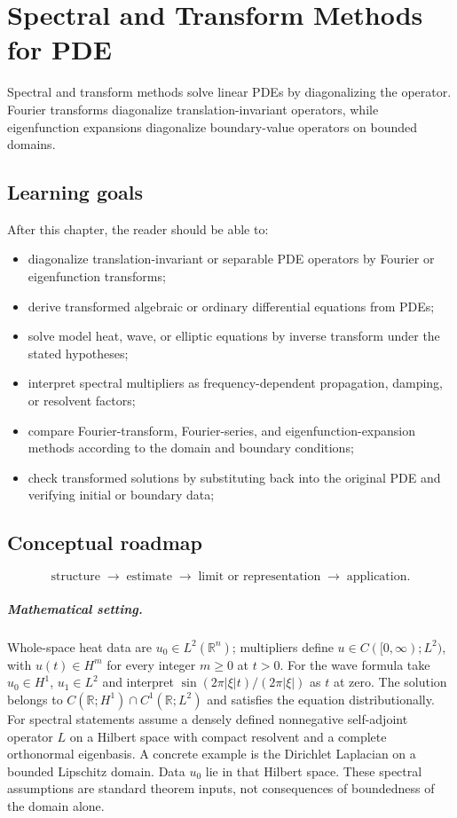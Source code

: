 \chapter{Spectral and Transform Methods for PDE}
\label{ch:iii28}

Spectral and transform methods solve linear PDEs by diagonalizing the operator. Fourier transforms diagonalize translation-invariant operators, while eigenfunction expansions diagonalize boundary-value operators on bounded domains.

\section*{Learning goals}
After this chapter, the reader should be able to:
\begin{itemize}
\item diagonalize translation-invariant or separable PDE operators by Fourier or eigenfunction transforms;
\item derive transformed algebraic or ordinary differential equations from PDEs;
\item solve model heat, wave, or elliptic equations by inverse transform under the stated hypotheses;
\item interpret spectral multipliers as frequency-dependent propagation, damping, or resolvent factors;
\item compare Fourier-transform, Fourier-series, and eigenfunction-expansion methods according to the domain and boundary conditions;
\item check transformed solutions by substituting back into the original PDE and verifying initial or boundary data;
\end{itemize}
\section*{Conceptual roadmap}
\[
\boxed{\text{structure}\;\longrightarrow\;\text{estimate}\;\longrightarrow\;\text{limit or representation}\;\longrightarrow\;\text{application}.}
\]

\paragraph{Mathematical setting.}
Whole-space heat data are $u_0\in L^2(\mathbb R^n)$; multipliers define $u\in C([0,\infty);L^2)$, with $u(t)\in H^m$ for every integer $m\ge0$ at $t>0$. For the wave formula take $u_0\in H^1$, $u_1\in L^2$ and interpret $\sin(2\pi|\xi|t)/(2\pi|\xi|)$ as $t$ at zero. The solution belongs to $C(\mathbb R;H^1)\cap C^1(\mathbb R;L^2)$ and satisfies the equation distributionally. For spectral statements assume a densely defined nonnegative self-adjoint operator $L$ on a Hilbert space with compact resolvent and a complete orthonormal eigenbasis. A concrete example is the Dirichlet Laplacian on a bounded Lipschitz domain. Data $u_0$ lie in that Hilbert space. These spectral assumptions are standard theorem inputs, not consequences of boundedness of the domain alone.


